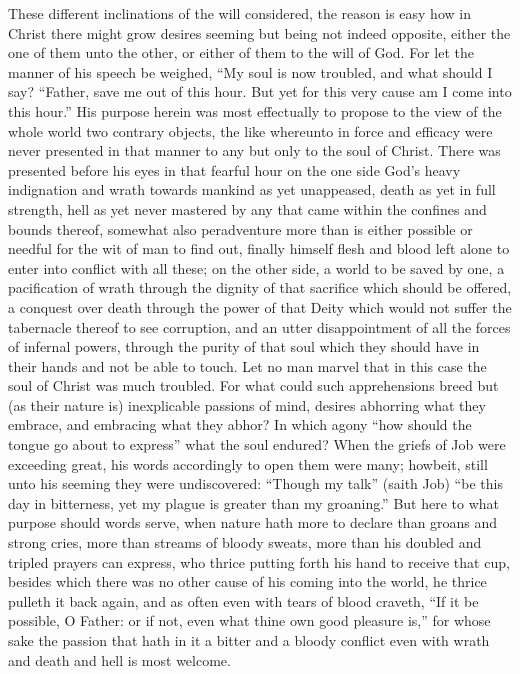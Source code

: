 These different inclinations of the will considered, the reason is easy how in Christ there might grow desires seeming but being not indeed opposite, either the one of them unto the other, or either of them to the will of God. For let the manner of his speech be weighed, “My soul is now troubled, and what should I say? “Father, save me out of this hour. But yet for this very cause am I come into this hour.” His purpose herein was most effectually to propose to the view of the whole world two contrary objects, the like whereunto in force and efficacy were never presented in that manner to any but only to the soul of Christ. There was presented before his eyes in that fearful hour on the one side God’s heavy indignation and wrath towards mankind as yet unappeased, death as yet in full strength, hell as yet never mastered by any that came within the confines and bounds thereof, somewhat also peradventure more than is either possible or needful for the wit of man to find out, finally himself flesh and blood left alone to enter into conflict with all these; on the other side, a  world to be saved by one,
 a pacification of wrath through the dignity of that sacrifice which should be offered, a conquest over death through the power of that Deity which would not suffer the tabernacle thereof to see corruption, and an utter disappointment of all the forces of infernal powers, through the purity of that soul which they should have in their hands and not be able to touch. Let no man marvel that in this case the soul of Christ was much troubled. For what could such apprehensions breed but (as their nature is) inexplicable passions of mind, desires abhorring what they embrace, and embracing what they abhor? In which agony “how should the tongue go about to express” what the soul endured? When the griefs of Job were exceeding great, his words accordingly to open them were many; howbeit, still unto his seeming they were undiscovered: “Though my talk” (saith Job) “be this day in bitterness, yet my plague is greater than my groaning.” But here to what purpose should words serve, when nature hath more to declare than groans and strong cries, more than streams of bloody sweats, more than his doubled and tripled prayers can express, who thrice putting forth his hand to receive that cup, besides which there was no other cause of his coming into the world, he thrice pulleth it back again, and as often even with tears of blood craveth, “If it be possible, O Father: or if not, even what thine own good pleasure is,” for whose sake the passion that hath in it a bitter and a bloody conflict even with wrath and death and hell is most welcome.

